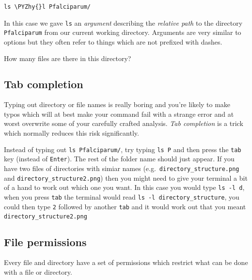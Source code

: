 \documentclass[11pt]{article}
\makeatletter
\def\PYZhy{\char`\-}
\newcommand{\boxspacing}{\kern\kvtcb@left@rule\kern\kvtcb@boxsep}
\newcommand{\prompt}[4]{
        {\ttfamily\llap{{\color{blue}\LARGE\faKeyboardO\hspace{3pt}#4}}\vspace{-\baselineskip}}
    }
\makeatother
\begin{document}
    \begin{tcolorbox}[breakable, size=fbox, boxrule=1pt, pad at break*=1mm,colback=cellbackground, colframe=cellborder]
\prompt{In}{incolor}{ }{\boxspacing}
\begin{Verbatim}[commandchars=\\\{\}]
ls \PYZhy{}l Pfalciparum/
\end{Verbatim}
\end{tcolorbox}

    In this case we gave \texttt{ls} an \textit{argument} describing the
\textit{relative path} to the directory \texttt{Pfalciparum} from our
current working directory. Arguments are very similar to options but
they often refer to things which are not prefixed with dashes.

How many files are there in this directory?

    \hypertarget{tab-completion}{%
\subsection{Tab completion}\label{tab-completion}}

Typing out directory or file names is really boring and you're likely to
make typos which will at best make your command fail with a strange
error and at worst overwrite some of your carefully crafted analysis.
\textit{Tab completion} is a trick which normally reduces this risk
significantly.

Instead of typing out \texttt{ls\ Pfalciparum/}, try typing
\texttt{ls\ P} and then press the \texttt{tab} key (instead of
\texttt{Enter}). The rest of the folder name should just appear. If you
have two files of directories with simiar names
(e.g.~\texttt{directory\_structure.png} and
\texttt{directory\_structure2.png}) then you might need to give your
terminal a bit of a hand to work out which one you want. In this case
you would type \texttt{ls\ -l\ d}, when you press \texttt{tab} the
terminal would read \texttt{ls\ -l\ directory\_structure}, you could
then type \texttt{2} followed by another \texttt{tab} and it would work
out that you meant \texttt{directory\_structure2.png}

    \hypertarget{file-permissions}{%
\subsection{File permissions}\label{file-permissions}}

Every file and directory have a set of permissions which restrict what
can be done with a file or directory.
\end{document}
